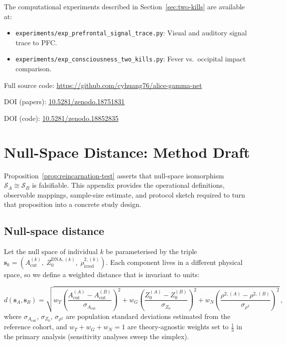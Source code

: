 \documentclass[aps,pre,twocolumn,superscriptaddress,floatfix]{revtex4-2}
\newcommand{\Acut}{A_{\text{cut}}}
\begin{document}
The computational experiments described in
Section~\ref{sec:two-kills} are available at:
\begin{itemize}
  \item \texttt{experiments/exp\_prefrontal\_signal\_trace.py}:
    Visual and auditory signal trace to PFC.
  \item \texttt{experiments/exp\_consciousness\_two\_kills.py}:
    Fever vs.\ occipital impact comparison.
\end{itemize}
Full source code: \url{https://github.com/cyhuang76/alice-gamma-net}

DOI (papers): \href{https://doi.org/10.5281/zenodo.18751831}{10.5281/zenodo.18751831}

DOI (code): \href{https://doi.org/10.5281/zenodo.18852835}{10.5281/zenodo.18852835}


\section{Null-Space Distance: Method Draft}
\label{app:null-space-method}

Proposition~\ref{prop:reincarnation-test} asserts that
null-space isomorphism $\mathcal{S}_A\cong\mathcal{S}_B$
is falsifiable.  This appendix provides the operational
definitions, observable mappings, sample-size estimate,
and protocol sketch required to turn that proposition
into a concrete study design.

\subsection{Null-space distance}
\label{app:distance}

Let the null space of individual $k$ be parameterised by
the triple
$\bm{s}_k = (\Acut^{(k)},\; Z_0^{\text{DNA},(k)},\;
  \rho_{\text{irred}}^{2,(k)})$.
Each component lives in a different physical space, so we
define a weighted distance that is invariant to units:

\begin{equation}
  d(\bm{s}_A,\bm{s}_B)
  = \sqrt{
      w_T \left(\frac{\Acut^{(A)}-\Acut^{(B)}}
                     {\sigma_{\Acut}}\right)^{\!2}
    + w_G \left(\frac{Z_0^{(A)}-Z_0^{(B)}}
                     {\sigma_{Z_0}}\right)^{\!2}
    + w_N \left(\frac{\rho^{2,(A)}-\rho^{2,(B)}}
                     {\sigma_{\rho^2}}\right)^{\!2}
  }\,,
  \label{eq:null-space-distance}
\end{equation}
where $\sigma_{\Acut}$, $\sigma_{Z_0}$, $\sigma_{\rho^2}$
are population standard deviations estimated from the
reference cohort, and $w_T + w_G + w_N = 1$ are
theory-agnostic weights set to $\tfrac{1}{3}$ in the
primary analysis (sensitivity analyses sweep the simplex).
\end{document}
